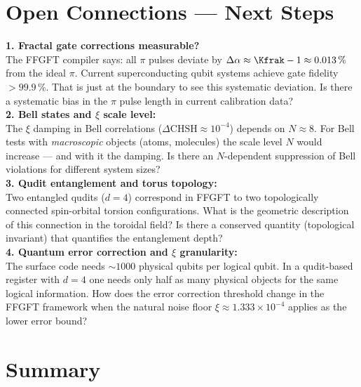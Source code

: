 \section{Open Connections --- Next Steps}
\label{sec:open-175}

\begin{significance}
\textbf{1. Fractal gate corrections measurable?}\\
The FFGFT compiler says: all $\pi$ pulses deviate
by $\Delta\alpha \approx \Kfrak - 1 \approx 0.013\,\%$
from the ideal $\pi$.
Current superconducting qubit systems achieve
gate fidelity $>99.9\,\%$.
That is just at the boundary to see this
systematic deviation.
Is there a systematic bias in the $\pi$ pulse length
in current calibration data?\\[6pt]

\textbf{2. Bell states and $\xi$ scale level:}\\
The $\xi$ damping in Bell correlations
($\Delta\text{CHSH} \approx 10^{-4}$) depends on $N \approx 8$.
For Bell tests with \emph{macroscopic} objects
(atoms, molecules) the scale level $N$ would increase ---
and with it the damping.
Is there an $N$-dependent suppression
of Bell violations for different system sizes?\\[6pt]

\textbf{3. Qudit entanglement and torus topology:}\\
Two entangled qudits ($d = 4$) correspond
in FFGFT to two topologically connected
spin-orbital torsion configurations.
What is the geometric description
of this connection in the toroidal field?
Is there a conserved quantity (topological invariant)
that quantifies the entanglement depth?\\[6pt]

\textbf{4. Quantum error correction and $\xi$ granularity:}\\
The surface code needs $\sim 1000$ physical qubits
per logical qubit.
In a qudit-based register with $d = 4$
one needs only half as many physical objects
for the same logical information.
How does the error correction threshold change
in the FFGFT framework when the natural noise floor
$\xi \approx 1.333 \times 10^{-4}$ applies as
the lower error bound?
\end{significance}

\section{Summary}
\label{sec:summary-175}


